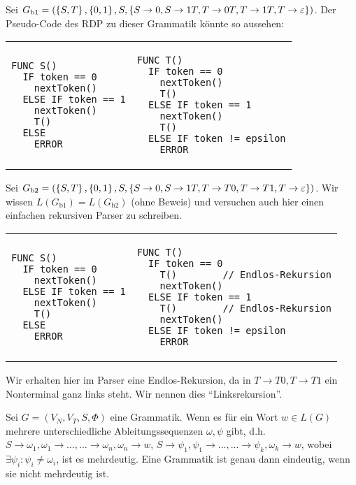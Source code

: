 \begin{bsp}
Sei $G_{\text{b1}}=(\left\{S,T\right\},\left\{0,1\right\},S,\left\{S \to 0,S \to 1T, T \to 0T, T \to 1T, T \to \varepsilon\right\})$.
Der Pseudo-Code des RDP zu dieser Grammatik könnte so aussehen:

\begin{tabular}{p{0.47\hsize}p{0.47\hsize}}
\begin{verbatim}
FUNC S()
  IF token == 0
    nextToken()
  ELSE IF token == 1
    nextToken()
    T()
  ELSE
    ERROR
\end{verbatim}
&
\begin{verbatim}
FUNC T()
  IF token == 0
    nextToken()
    T()
  ELSE IF token == 1
    nextToken()
    T()
  ELSE IF token != epsilon
    ERROR  
\end{verbatim}
\end{tabular}
\end{bsp}

\begin{bsp}
Sei $G_{\text{b2}}=\left(\left\{S,T\right\},\left\{0,1\right\},S,\left\{S \to 0, S \to 1T, T \to T0, T \to T1, T \to \varepsilon\right\}\right)$.
Wir wissen $L(G_{\text{b1}})=L(G_{\text{b2}})$ (ohne Beweis) und versuchen auch hier einen einfachen rekursiven Parser zu schreiben.

\begin{tabular}{p{0.47\hsize}p{0.47\hsize}}
\begin{verbatim}
FUNC S()
  IF token == 0
    nextToken()
  ELSE IF token == 1
    nextToken()
    T()
  ELSE
    ERROR
\end{verbatim}
&
\begin{verbatim}
FUNC T()
  IF token == 0
    T()        // Endlos-Rekursion
    nextToken()
  ELSE IF token == 1
    T()        // Endlos-Rekursion
    nextToken()
  ELSE IF token != epsilon
    ERROR  
\end{verbatim}
\end{tabular}
\vspace{-0.3cm}

Wir erhalten hier im Parser eine Endlos-Rekursion, da in $T \to T0, T \to T1$ ein Nonterminal ganz links steht. Wir nennen dies ``Linksrekursion''.
\end{bsp}

\begin{defn}
Sei $G=(V_N,V_T,S,\Phi)$ eine Grammatik. Wenn es für ein Wort $w \in L(G)$ mehrere
unterschiedliche Ableitungssequenzen $\omega,\psi$ gibt, d.h. $S \to \omega_1, \omega_1 \to \ldots, \ldots \to \omega_n, \omega_n \to w$,
                                                         $S \to \psi_1, \psi_1 \to \ldots, \ldots \to \psi_k, \omega_k \to w$,
wobei $\exists \psi_i : \psi_i \neq \omega_i$, ist es mehrdeutig. Eine Grammatik ist genau dann eindeutig, wenn sie nicht mehrdeutig ist.
\end{defn}


